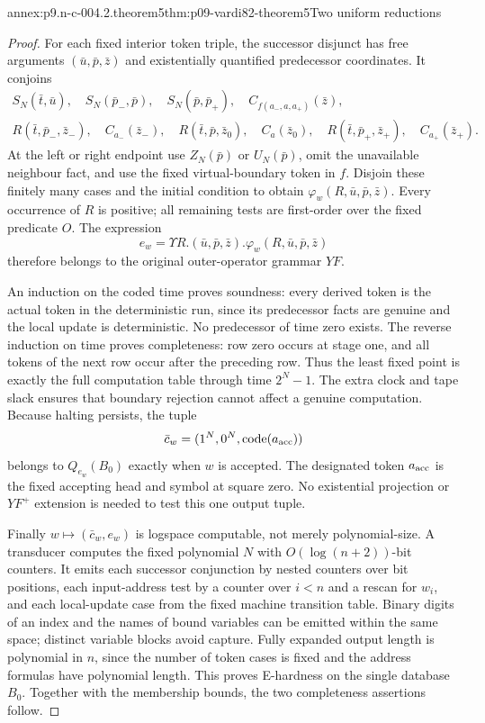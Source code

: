 \begin{annexitem}{annex:p9.n-c-004.2.theorem5}{thm:p09-vardi82-theorem5}{Two uniform reductions}
\begin{proof}
For each fixed interior token triple, the successor disjunct has free
arguments \((\bar u,\bar p,\bar z)\) and existentially quantified
predecessor coordinates. It conjoins
\[
\begin{gathered}
 S_N(\bar t,\bar u),\quad
 S_N(\bar p_-,\bar p),\quad S_N(\bar p,\bar p_+),\quad
 C_{f(a_-,a,a_+)}(\bar z),\\
 R(\bar t,\bar p_-,\bar z_-),\quad C_{a_-}(\bar z_-),\quad
 R(\bar t,\bar p,\bar z_0),\quad C_a(\bar z_0),\quad
 R(\bar t,\bar p_+,\bar z_+),\quad C_{a_+}(\bar z_+).
\end{gathered}
\]
At the left or right endpoint use \(Z_N(\bar p)\) or
\(U_N(\bar p)\), omit the unavailable neighbour fact, and use the
fixed virtual-boundary token in \(f\). Disjoin these finitely many cases
and the initial condition to obtain \(\varphi_w(R,\bar u,\bar p,\bar z)\).
Every occurrence of \(R\) is positive; all remaining tests are
first-order over the fixed predicate \(O\). The expression
\[
 e_w=\Upsilon R.(\bar u,\bar p,\bar z).
                         \varphi_w(R,\bar u,\bar p,\bar z)
\]
therefore belongs to the original outer-operator grammar \(YF\).

An induction on the coded time proves soundness: every derived token is
the actual token in the deterministic run, since its predecessor facts
are genuine and the local update is deterministic. No predecessor of
time zero exists. The reverse induction on time proves completeness:
row zero occurs at stage one, and all tokens of the next row occur after
the preceding row. Thus the least fixed point is exactly the full
computation table through time \(2^N-1\). The extra clock and tape slack
ensures that boundary rejection cannot affect a genuine computation.
Because halting persists, the tuple
\[
 \bar c_w=(1^N,0^N,\operatorname{code}(a_{\rm acc}))
\]
belongs to \(Q_{e_w}(B_0)\) exactly when \(w\) is accepted. The
designated token \(a_{\rm acc}\) is the fixed accepting head and symbol
at square zero. No existential projection or \(YF^+\) extension is
needed to test this one output tuple.

Finally \(w\mapsto(\bar c_w,e_w)\) is logspace computable, not merely
polynomial-size. A transducer computes the fixed polynomial \(N\) with
\(O(\log(n+2))\)-bit counters. It emits each successor conjunction by
nested counters over bit positions, each input-address test by a counter
over \(i<n\) and a rescan for \(w_i\), and each local-update case from
the fixed machine transition table. Binary digits of an index and the
names of bound variables can be emitted within the same space; distinct
variable blocks avoid capture. Fully expanded output length is polynomial
in \(n\), since the number of token cases is fixed and the address
formulas have polynomial length. This proves E-hardness on the single
database \(B_0\). Together with the membership bounds, the two
completeness assertions follow.
\end{proof}
\end{annexitem}

